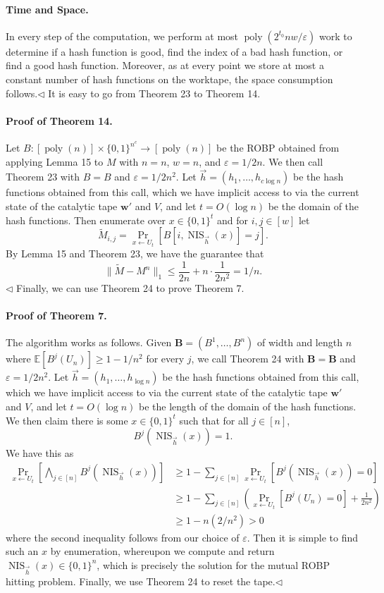 \documentclass[10pt,a4paper]{article}
\begin{document}
\paragraph{Time and Space.} In every step of the computation, we perform at most $\operatorname{poly}(2^{t_0}nw/\varepsilon)$ work to determine if a hash function is good, find the index of a bad hash function, or find a good hash function. Moreover, as at every point we store at most a constant number of hash functions on the worktape, the space consumption follows.\hfill$\triangleleft$
It is easy to go from Theorem 23 to Theorem 14.
\paragraph{Proof of Theorem 14.} Let $B:[\operatorname{poly}(n)]\times\{0,1\}^{n^c}\to[\operatorname{poly}(n)]$ be the ROBP obtained from applying Lemma 15 to $M$ with $n=n$, $w=n$, and $\varepsilon=1/2n$. We then call Theorem 23 with $B=B$ and $\varepsilon=1/2n^2$. Let $\vec h=(h_1,\ldots,h_{c\log n})$ be the hash functions obtained from this call, which we have implicit access to via the current state of the catalytic tape $\mathbf w'$ and $V$, and let $t=O(\log n)$ be the domain of the hash functions. Then enumerate over $x\in\{0,1\}^t$ and for $i,j\in[w]$ let
\[\widetilde M_{i,j}=\Pr_{x\leftarrow U_t}[B[i,\operatorname{NIS}_{\vec h}(x)]=j].\]
By Lemma 15 and Theorem 23, we have the guarantee that
\[\|\widetilde M-M^n\|_1\leq\frac1{2n}+n\cdot\frac1{2n^2}=1/n.\]\hfill$\triangleleft$
Finally, we can use Theorem 24 to prove Theorem 7.
\paragraph{Proof of Theorem 7.} The algorithm works as follows. Given $\mathbf B=(B^1,\ldots,B^n)$ of width and length $n$ where $\mathbb E[B^j(U_n)]\geq1-1/n^2$ for every $j$, we call Theorem 24 with $\mathbf B=\mathbf B$ and $\varepsilon=1/2n^2$. Let $\vec h=(h_1,\ldots,h_{\log n})$ be the hash functions obtained from this call, which we have implicit access to via the current state of the catalytic tape $\mathbf w'$ and $V$, and let $t=O(\log n)$ be the length of the domain of the hash functions. We then claim there is some $x\in\{0,1\}^t$ such that for all $j\in[n]$,
\[B^j(\operatorname{NIS}_{\vec h}(x))=1.\]
We have this as
\begin{align*}
\Pr_{x\leftarrow U_t}\left[\bigwedge_{j\in[n]}B^j(\operatorname{NIS}_{\vec h}(x))\right]&\geq1-\sum_{j\in[n]}\Pr_{x\leftarrow U_t}[B^j(\operatorname{NIS}_{\vec h}(x))=0]\\
&\geq1-\sum_{j\in[n]}\left(\Pr_{x\leftarrow U_t}[B^j(U_n)=0]+\frac1{2n^2}\right)\\
&\geq1-n(2/n^2)>0
\end{align*}
where the second inequality follows from our choice of $\varepsilon$. Then it is simple to find such an $x$ by enumeration, whereupon we compute and return $\operatorname{NIS}_{\vec h}(x)\in\{0,1\}^n$, which is precisely the solution for the mutual ROBP hitting problem. Finally, we use Theorem 24 to reset the tape.\hfill$\triangleleft$
\end{document}
